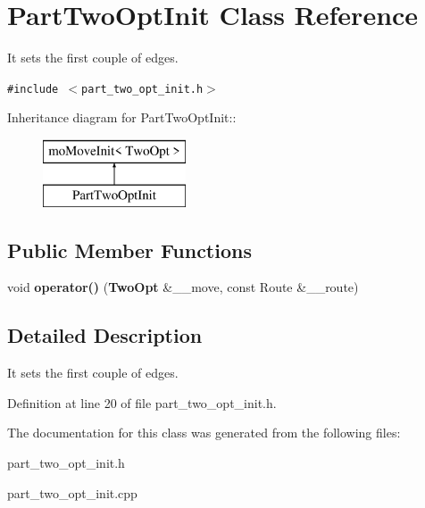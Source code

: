 \section{PartTwoOptInit Class Reference}
\label{class_part_two_opt_init}
It sets the first couple of edges.  


{\tt \#include $<$part\_\-two\_\-opt\_\-init.h$>$}

Inheritance diagram for PartTwoOptInit::\begin{figure}[H]
\begin{center}
\leavevmode
\includegraphics[height=2cm]{class_part_two_opt_init}
\end{center}
\end{figure}
\subsection*{Public Member Functions}
\begin{CompactItemize}
\item 
void {\bf operator()} ({\bf TwoOpt} \&\_\-\_\-move, const Route \&\_\-\_\-route)\label{class_part_two_opt_init_2f6190b1700ca1a12d0baaceaf75383c}

\end{CompactItemize}


\subsection{Detailed Description}
It sets the first couple of edges. 



Definition at line 20 of file part\_\-two\_\-opt\_\-init.h.

The documentation for this class was generated from the following files:\begin{CompactItemize}
\item 
part\_\-two\_\-opt\_\-init.h\item 
part\_\-two\_\-opt\_\-init.cpp\end{CompactItemize}
